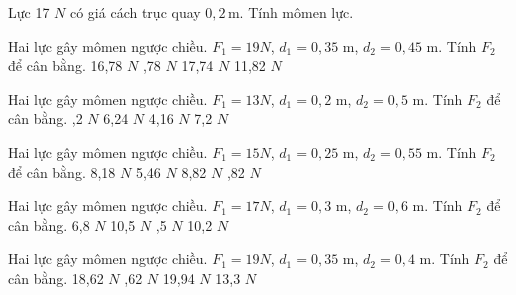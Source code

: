 \begin{bt}
Lực 17 $N$ có giá cách trục quay $0,2\,\text{m}$. Tính mômen lực.
\end{bt}

\begin{ex}
Hai lực gây mômen ngược chiều. $F_1=19N$, $d_1=0,35$ m, $d_2=0,45$ m. Tính $F_2$ để cân bằng.
\choice
{16,78 $N$}
{,78 $N$}
{17,74 $N$}
{11,82 $N$}
\end{ex}

\begin{ex}
Hai lực gây mômen ngược chiều. $F_1=13N$, $d_1=0,2$ m, $d_2=0,5$ m. Tính $F_2$ để cân bằng.
\choice
{,2 $N$}
{6,24 $N$}
{4,16 $N$}
{7,2 $N$}
\end{ex}

\begin{ex}
Hai lực gây mômen ngược chiều. $F_1=15N$, $d_1=0,25$ m, $d_2=0,55$ m. Tính $F_2$ để cân bằng.
\choice
{8,18 $N$}
{5,46 $N$}
{8,82 $N$}
{,82 $N$}
\end{ex}

\begin{ex}
Hai lực gây mômen ngược chiều. $F_1=17N$, $d_1=0,3$ m, $d_2=0,6$ m. Tính $F_2$ để cân bằng.
\choice
{6,8 $N$}
{10,5 $N$}
{,5 $N$}
{10,2 $N$}
\end{ex}

\begin{ex}
Hai lực gây mômen ngược chiều. $F_1=19N$, $d_1=0,35$ m, $d_2=0,4$ m. Tính $F_2$ để cân bằng.
\choice
{18,62 $N$}
{,62 $N$}
{19,94 $N$}
{13,3 $N$}
\end{ex}


